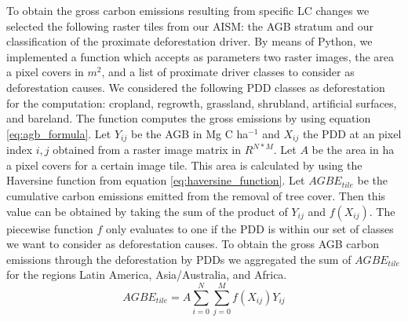 		To obtain the gross carbon emissions resulting from specific \ac{LC} changes we selected the following raster tiles from our \ac{AISM}: the \ac{AGB} stratum and our classification of the proximate deforestation driver. By means of Python, we implemented a function which accepts as parameters two raster images, the area a pixel covers in $m^2$, and a list of proximate driver classes to consider as deforestation causes. We considered the following \ac{PDD} classes as deforestation for the computation: cropland, regrowth, grassland, shrubland, artificial surfaces, and bareland. The function computes the gross emissions by using  equation \ref{eq:agb_formula}. Let $Y_{ij}$ be the \ac{AGB} in Mg C ha$^{-1}$ and $X_{ij}$ the \ac{PDD} at an pixel index $i,j$ obtained from a raster image matrix in $R^{N*M}$. Let $A$ be the area in ha a pixel covers for a certain image tile. This area is calculated by using the Haversine function from equation \ref{eq:haversine_function}. Let $AGBE_{tile}$ be the cumulative carbon emissions emitted from the removal of tree cover. Then this value can be obtained by taking the sum of the product of $Y_{ij}$ and $f(X_{ij})$. The piecewise function $f$ only evaluates to one if the \ac{PDD} is within our set of classes we want to consider as deforestation causes. To obtain the gross \ac{AGB} carbon emissions through the deforestation by \acp{PDD} we aggregated the sum of $AGBE_{tile}$ for the regions Latin America, Asia/Australia, and Africa.
		\begin{equation}
		\label{eq:agb_formula}
			AGBE_{tile} = A\displaystyle\sum_{i=0}^{N}\displaystyle\sum_{j=0}^{M} f(X_{ij})Y_{ij}
		\end{equation}
